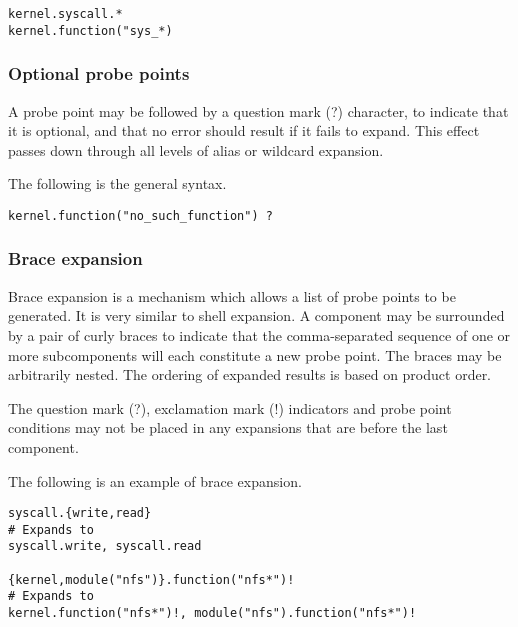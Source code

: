 \documentclass[twoside,english]{article}
\newenvironment{vindent}
{\begin{list}{}{\setlength{\listparindent}{6pt}}
\item[]}
{\end{list}}
\begin{document}
\begin{vindent}
\begin{verbatim}
kernel.syscall.*
kernel.function("sys_*)
\end{verbatim}
\end{vindent}

\subsubsection{Optional probe points\label{sub:Optional-probe-points}}
A probe point may be followed by a question mark (?) character, to indicate
that it is optional, and that no error should result if it fails to expand.
This effect passes down through all levels of alias or wildcard expansion.

The following is the general syntax.

\begin{vindent}
\begin{verbatim}
kernel.function("no_such_function") ?
\end{verbatim}
\end{vindent}

\subsubsection{Brace expansion}
Brace expansion is a mechanism which allows a list of probe points to be
generated. It is very similar to shell expansion. A component may be surrounded
by a pair of curly braces to indicate that the comma-separated sequence of
one or more subcomponents will each constitute a new probe point. The braces
may be arbitrarily nested. The ordering of expanded results is based on
product order.

The question mark (?), exclamation mark (!) indicators and probe point conditions
may not be placed in any expansions that are before the last component.

The following is an example of brace expansion.

\begin{vindent}
\begin{verbatim}
syscall.{write,read}
# Expands to
syscall.write, syscall.read

{kernel,module("nfs")}.function("nfs*")!
# Expands to
kernel.function("nfs*")!, module("nfs").function("nfs*")!
\end{verbatim}
\end{vindent}
\end{document}
